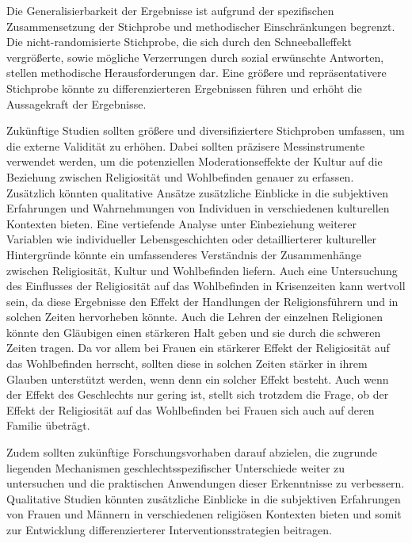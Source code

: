 Die Generalisierbarkeit der Ergebnisse ist aufgrund der spezifischen Zusammensetzung der Stichprobe und methodischer Einschränkungen begrenzt. Die nicht-randomisierte Stichprobe, die sich durch den Schneeballeffekt vergrößerte, sowie mögliche Verzerrungen durch sozial erwünschte Antworten, stellen methodische Herausforderungen dar. Eine größere und repräsentativere Stichprobe könnte zu differenzierteren Ergebnissen führen und erhöht die Aussagekraft der Ergebnisse. %

Zukünftige Studien sollten größere und diversifiziertere Stichproben umfassen, um die externe Validität zu erhöhen. Dabei sollten präzisere Messinstrumente verwendet werden, um die potenziellen Moderationseffekte der Kultur auf die Beziehung zwischen Religiosität und Wohlbefinden genauer zu erfassen. Zusätzlich könnten qualitative Ansätze zusätzliche Einblicke in die subjektiven Erfahrungen und Wahrnehmungen von Individuen in verschiedenen kulturellen Kontexten bieten. Eine vertiefende Analyse unter Einbeziehung weiterer Variablen wie individueller Lebensgeschichten oder detaillierterer kultureller Hintergründe könnte ein umfassenderes Verständnis der Zusammenhänge zwischen Religiosität, Kultur und Wohlbefinden liefern. Auch eine Untersuchung des Einflusses der Religiosität auf das Wohlbefinden in Krisenzeiten kann wertvoll sein, da diese Ergebnisse den Effekt der Handlungen der Religionsführern und in solchen Zeiten hervorheben könnte. Auch die Lehren der einzelnen Religionen könnte den Gläubigen einen stärkeren Halt geben und sie durch die schweren Zeiten tragen. Da vor allem bei Frauen ein stärkerer Effekt der Religiosität auf das Wohlbefinden herrscht, sollten diese in solchen Zeiten stärker in ihrem Glauben unterstützt werden, wenn denn ein solcher Effekt besteht. Auch wenn der Effekt des Geschlechts nur gering ist, stellt sich trotzdem die Frage, ob der Effekt der Religiosität auf das Wohlbefinden bei Frauen sich auch auf deren Familie übeträgt.

Zudem sollten zukünftige Forschungsvorhaben darauf abzielen, die zugrunde liegenden Mechanismen geschlechtsspezifischer Unterschiede weiter zu untersuchen und die praktischen Anwendungen dieser Erkenntnisse zu verbessern. Qualitative Studien könnten zusätzliche Einblicke in die subjektiven Erfahrungen von Frauen und Männern in verschiedenen religiösen Kontexten bieten und somit zur Entwicklung differenzierterer Interventionsstrategien beitragen.

